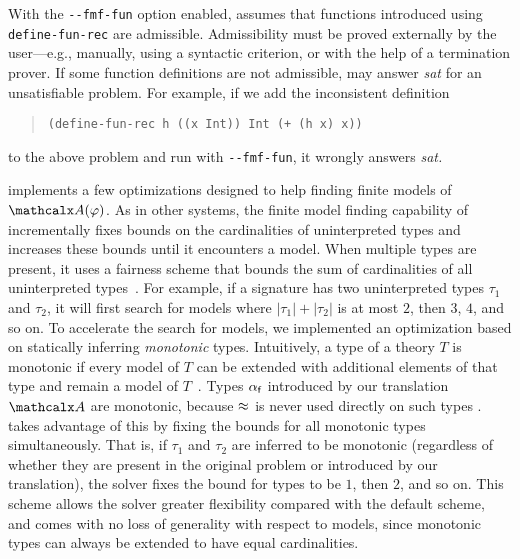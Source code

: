 With the \texttt{-}\texttt{-fmf-fun} option enabled, \cvc assumes that
functions introduced using \texttt{define-\allowbreak fun-\allowbreak rec} are admissible.
Admissibility must be proved externally by the user---e.g., manually, using a
syntactic criterion, or with the help of a termination prover.
If some function definitions are not admissible, \cvc may answer \emph{sat} for
an unsatisfiable problem. For example, if we add the inconsistent definition
%
\begin{quote}
\begin{verbatim}
(define-fun-rec h ((x Int)) Int (+ (h x) x))
\end{verbatim}
\end{quote}
%
to the above problem and run \cvc with \texttt{-}\texttt{-fmf-fun},
it wrongly answers \emph{sat.}

\cvc implements a few optimizations designed to help finding finite models of
$\conv(\varphi)$.
As in other systems,
the finite model finding capability of \cvc incrementally fixes bounds on the cardinalities of uninterpreted types
and increases these bounds until it encounters a model.
When multiple types are present, it uses a fairness scheme that
bounds the sum of cardinalities of all uninterpreted types~\cite{reynolds2013finite}.
For example, if a signature has two uninterpreted types $\tau_1$ and $\tau_2$,
it will first search for models where
$\left\vert\tau_1\right\vert + \left\vert\tau_2\right\vert$ is at most $2$,
then $3$, $4$, and so on.
To accelerate the search for models,
we implemented an optimization based on statically inferring \emph{monotonic} types.
Intuitively, a type of a theory $T$ is monotonic if every model of $T$ can be extended with additional
elements of that type and remain a model of $T$~\cite{blanchette-krauss-2011,claessen-et-al-2011}.
Types $\alpha_{\mathsf{f}}$ introduced by our translation $\conv$ are monotonic,
because $\approx$ is never used directly on such types \cite{claessen-et-al-2011}.
%
\cvc takes advantage of this by fixing the bounds for all
monotonic types simultaneously.
That is, if $\tau_1$ and $\tau_2$ are inferred to be monotonic (regardless
of whether they are present in the original problem or introduced by our translation),
the solver fixes the bound for  types to be $1$, then $2$, and so on.
This scheme allows the solver greater flexibility compared with the default scheme,
and comes with no loss of generality with respect to models,
since monotonic types can always be extended to have equal cardinalities.

